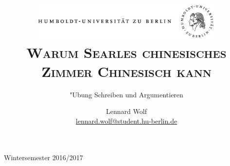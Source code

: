 \documentclass[a4paper, emulatestandardclasses, 12pt]{scrartcl}
\date{\vspace{-3ex}}
\begin{document}
\title{\vspace{5ex}
	\includegraphics*[width=0.72\textwidth]{images/hu_logo.png}\\
	\vspace{30pt}
	\scshape\LARGE{Warum Searles chinesisches\\Zimmer Chinesisch kann}}
	
	\subtitle{\vspace{20pt}"Ubung Schreiben und Argumentieren\\
          }

\author{\vspace{-4pt}Lennard Wolf\\
        \small{\href{mailto:lennard.wolf@student.hu-berlin.de}{lennard.wolf@student.hu-berlin.de}}}      

\maketitle

\vspace{\fill}

\begin{minipage}[b]{\textwidth}
    \centering
    \onehalfspacing
    \large   
    Wintersemester 2016/2017

    \vspace{-20mm} 
\end{minipage}%
\thispagestyle{empty}
\newpage
\clearpage
\setcounter{page}{1}
\end{document}
